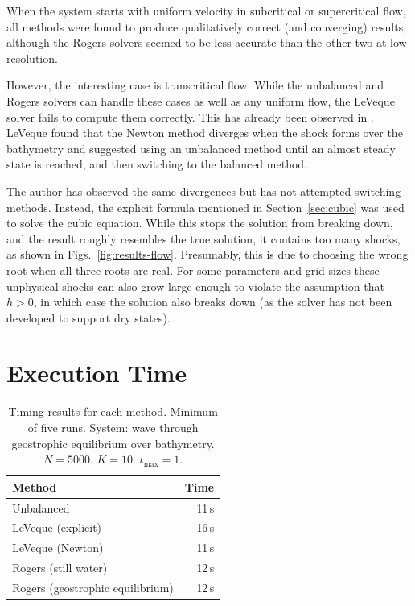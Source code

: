 When the system starts with uniform velocity in subcritical or supercritical flow, all methods were found to produce qualitatively correct (and converging) results, although the Rogers solvers seemed to be less accurate than the other two at low resolution.

However, the interesting case is transcritical flow. While the unbalanced and Rogers solvers can handle these cases as well as any uniform flow, the LeVeque solver fails to compute them correctly. This has already been observed in \citet{leveque1998balancing}. LeVeque found that the Newton method diverges when the shock forms over the bathymetry and suggested using an unbalanced method until an almost steady state is reached, and then switching to the balanced method.

The author has observed the same divergences but has not attempted switching methods. Instead, the explicit formula mentioned in Section~\ref{sec:cubic} was used to solve the cubic equation. While this stops the solution from breaking down, and the result roughly resembles the true solution, it contains too many shocks, as shown in Figs.~\ref{fig:results-flow}. Presumably, this is due to choosing the wrong root when all three roots are real. For some parameters and grid sizes these unphysical shocks can also grow large enough to violate the assumption that $h > 0$, in which case the solution also breaks down (as the solver has not been developed to support dry states).

\section{Execution Time}

\begin{table}
  \centering
  \begin{tabular}{lr}
    Method & Time \\
    \hline
    Unbalanced & 11\,s \\
    LeVeque (explicit) & 16\,s\\
    LeVeque (Newton) & 11\,s\\
    Rogers (still water) & 12\,s\\
    Rogers (geostrophic equilibrium) & 12\,s
  \end{tabular}
  \caption{Timing results for each method. Minimum of five runs. System: wave through geostrophic equilibrium over bathymetry. $N = 5000$. $K = 10$. $t_{\mathrm{max}} = 1$.}
  \label{tab:timing}
\end{table}

